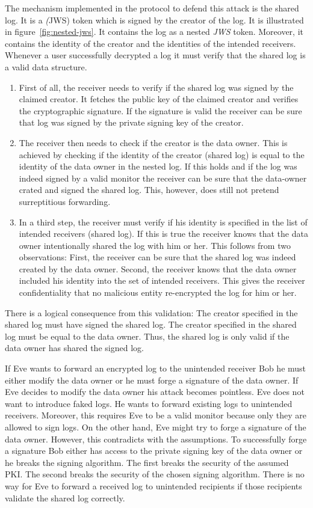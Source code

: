 \documentclass[../main.tex]{subfiles}
\begin{document}
The mechanism implemented in the protocol to defend this attack is the shared log.
It is a \emph(JWS) token which is signed by the creator of the log.
It is illustrated in figure~\ref{fig:nested-jws}.
It contains the log as a nested \emph{JWS} token.
Moreover, it contains the identity of the creator and the identities of the intended receivers.
Whenever a user successfully decrypted a log it must verify that the shared log is a valid data structure.
\begin{enumerate}
\item 
First of all, the receiver needs to verify if the shared log was signed by the claimed creator.
It fetches the public key of the claimed creator and verifies the cryptographic signature.
If the signature is valid the receiver can be sure that log was signed by the private signing key of the creator.
\item 
The receiver then needs to check if the creator is the data owner. 
This is achieved by checking if the identity of the creator (shared log) is equal to the identity of the data owner in the nested log.
If this holds and if the log was indeed signed by a valid monitor the receiver can be sure that the data-owner crated and signed the shared log.
This, however, does still not pretend surreptitious forwarding.
\item 
In a third step, the receiver must verify if his identity is specified in the list of intended receivers (shared log).
If this is true the receiver knows that the data owner intentionally shared the log with him or her.
This follows from two observations:
First, the receiver can be sure that the shared log was indeed created by the data owner.
Second, the receiver knows that the data owner included his identity into the set of intended receivers.
This gives the receiver confidentiality that no malicious entity re-encrypted the log for him or her.
\end{enumerate}

There is a logical consequence from this validation:
The creator specified in the shared log must have signed the shared log.
The creator specified in the shared log must be equal to the data owner.
Thus, the shared log is only valid if the data owner has shared the signed log.

If Eve wants to forward an encrypted log to the unintended receiver Bob he must either modify the data owner or he must forge a signature of the data owner.
If Eve decides to modify the data owner his attack becomes pointless.
Eve does not want to introduce faked logs.
He wants to forward existing logs to unintended receivers.
Moreover, this requires Eve to be a valid monitor because only they are allowed to sign logs.
On the other hand, Eve might try to forge a signature of the data owner.
However, this contradicts with the assumptions.
To successfully forge a signature Bob either has access to the private signing key of the data owner or he breaks the signing algorithm.
The first breaks the security of the assumed PKI.
The second breaks the security of the chosen signing algorithm.
There is no way for Eve to forward a received log to unintended recipients if those recipients validate the shared log correctly.
\end{document}
